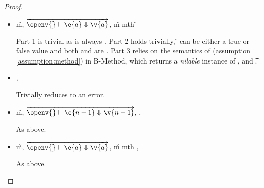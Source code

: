 \begin{lemma}
\begin{proof}
\begin{case}[T-MethodStatic]
\begin{itemize}
  \item[]
\begin{subcase}[B-Method]
  \opsem {\openv{}}
         {}
         {\v{m}},
  $\overrightarrow{
  \opsem {\openv{}}
         {\e{a}}
         {\v{a}}}$,
   {\v{m}} {mth}
                    {} {}
                    {}
                    {\v{}}


Part 1 is trivial as \object{} is always \emptyobject{}.
Part 2 holds trivially, \v{} can be either a true or false value
and both {\thenprop{\prop{}}} and {\elseprop{\prop{}}}
are \topprop{}.
Part 3 relies on the semantics of \invokejavamethodliteral (assumption \ref{assumption:method})
in B-Method, which returns a \emph{nilable} instance of ,
and  {\t{}}.
\end{subcase}

  \item[]
\begin{subcase}[BE-Method1]
  \opsem {\openv{}}
         {}
         {\errorval{\v{}}},
  \opsem {\openv{}}
         {\e{}}
         {\errorval{\v{}}}

         Trivially reduces to an error.
\end{subcase}
  \item[]
\begin{subcase}[BE-Method2]
  \opsem {\openv{}}
         {}
         {\v{m}},
 $\overrightarrow{
  \opsem {\openv{}}
         {\e{n-1}}
         {\v{n-1}}
       }$,
  \opsem {\openv{}}
         {}
         {\errorval{\v{}}},
  \opsem {\openv{}}
         {\e{}}
         {\errorval{\v{}}}

  As above.
\end{subcase}
  \item[]
\begin{subcase}[BE-Method3]
  \opsem {\openv{}}
         {}
         {\v{m}},
  $\overrightarrow{
  \opsem {\openv{}}
         {\e{a}}
         {\v{a}}
       }$,
   {\v{m}} {mth}
                    {} {}
                    {}
                    {\errorvalv{}},
  \opsem {\openv{}} {\e{}} {\errorvalv{}}

  As above.

\end{subcase}
\end{itemize}


\end{case}
\end{proof}
\end{lemma}

